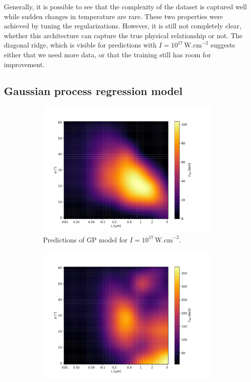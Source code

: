 Generally, it is possible to see that the complexity of the dataset is captured well while sudden changes in temperature are rare. These two properties were achieved by tuning the regularizations. However, it is still not completely clear, whether this architecture can capture the true physical relationship or not. The diagonal ridge, which is visible for predictions with $I = 10^{17} \, \mathrm{W.cm}^{-2}$ suggests either that we need more data, or that the training still has room for improvement.


\subsection*{Gaussian process regression model}

\begin{figure}[ht]
	\centering
	\begin{subfigure}{0.49\textwidth}
		\centering
		\includegraphics[width=\textwidth]{figures/gp17_pred}
		\caption{Predictions of GP model for $I = 10^{17} \, \mathrm{W.cm}^{-2}$.}
		\label{fig:gp-pred-a}
	\end{subfigure}
	\hfill
	\begin{subfigure}{0.49\textwidth}
		\centering
		\includegraphics[width=\textwidth]{figures/gp18_pred}

\end{subfigure}
\end{figure}
